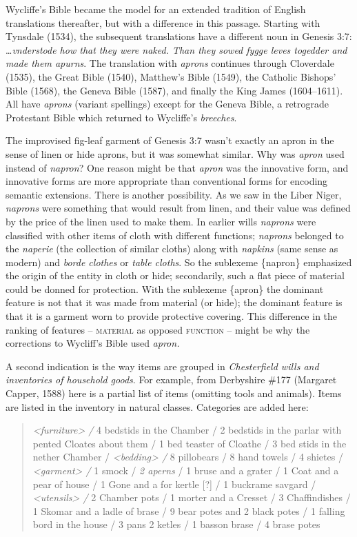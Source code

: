 \documentclass[output=paper,
modfonts
]{LSP/langsci}
\begin{document}
Wycliffe's Bible became the model for an extended tradition of English
translations thereafter, but with a difference in this passage. Starting
with Tynsdale (1534), the subsequent translations have a different noun
in Genesis 3:7: \ldots{}\emph{vnderstode how that they were naked. Than
they sowed fygge leves togedder and made them apurns}. The translation
with \emph{aprons} continues through Cloverdale (1535), the Great Bible
(1540), Matthew's Bible (1549), the Catholic Bishops' Bible (1568), the
Geneva Bible (1587), and finally the King James (1604--1611). All have
\emph{aprons} (variant spellings) except for the Geneva Bible, a
retrograde Protestant Bible which returned to Wycliffe's
\emph{breeches}.

The improvised fig-leaf garment of Genesis 3:7 wasn't exactly an apron
in the sense of linen or hide aprons, but it was somewhat similar. Why
was \emph{apron} used instead of \emph{napron}? One reason might be that
\emph{apron} was the innovative form, and innovative forms are more
appropriate than conventional forms for encoding semantic extensions.
There is another possibility. As we saw in the Liber Niger,
\emph{naprons} were something that would result from linen, and their
value was defined by the price of the linen used to make them. In
earlier wills \emph{naprons} were classified with other items of cloth
with different functions; \emph{naprons} belonged to the \emph{naperie}
(the collection of similar cloths) along with \emph{napkins} (same sense
as modern) and \emph{borde clothes} or \emph{table cloths}. So the
sublexeme \{napron\} emphasized the origin of the entity in cloth or
hide; secondarily, such a flat piece of material could be donned for
protection. With the sublexeme \{apron\} the dominant feature is not
that it was made from material (or hide); the dominant feature is that it is
a garment worn to provide protective covering. This difference in the
ranking of features -- \textsc{material} as opposed
\textsc{function} -- might be why the corrections to Wycliff's Bible used
\emph{apron.}

A second indication is the way items are grouped in \emph{Chesterfield wills and inventories of
household goods}. For example, from
Derbyshire \#177 (Margaret Capper, 1588) here is a partial list of items
(omitting tools and animals). Items are listed in the inventory in
natural classes. Categories are added here:

\begin{quote}
\emph{\textless{}furniture\textgreater{} /} 4 bedstids in the Chamber /
2 bedstids in the parlar with pented Cloates about them / 1 bed teaster
of Cloathe / 3 bed stids in the nether Chamber /
\emph{\textless{}bedding\textgreater{} /} 8 pillobears / 8 hand towels /
4 shietes / \emph{\textless{}garment\textgreater{} /} 1 smock / \emph{2
aperns} / 1 bruse and a grater / 1 Coat and a pear of house / 1 Gone and
a for kertle {[}?{]} / 1 buckrame savgard /
\emph{\textless{}utensils\textgreater{} /} 2 Chamber pots / 1 morter and
a Cresset / 3 Chaffindishes / 1 Skomar and a ladle of brase / 9 bear
potes and 2 black potes / 1 falling bord in the house / 3 pans 2 ketles
/ 1 basson brase / 4 brase potes
\end{quote}
\end{document}
